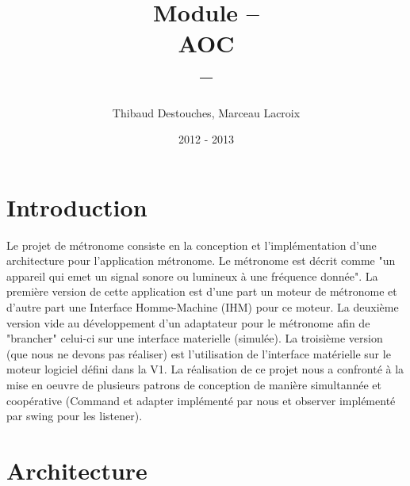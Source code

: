 \documentclass{article}
\title{Module --
\\
AOC
\\
--}
\author{Thibaud Destouches, Marceau Lacroix}
\date{2012 - 2013}
\begin{document}
\begin{titlepage}
\maketitle
\tableofcontents
\end{titlepage}

\newpage
\section{Introduction}
Le projet de métronome consiste en la conception et l'implémentation d'une architecture pour l'application métronome. Le métronome est décrit comme "un appareil qui emet un signal sonore ou lumineux à une fréquence donnée". La première version de cette application est d'une part un moteur de métronome et d'autre part une Interface Homme-Machine (IHM) pour ce moteur. La deuxième version vide au développement d'un adaptateur pour le métronome afin de "brancher" celui-ci sur une interface materielle (simulée). La troisième version (que nous ne devons pas réaliser) est l'utilisation de l'interface matérielle sur le moteur logiciel défini dans la V1. La réalisation de ce projet nous a confronté à la mise en oeuvre de plusieurs patrons de conception de manière simultannée et coopérative (Command et adapter implémenté par nous et observer implémenté par swing pour les listener). 

\section{Architecture}
\end{document}

